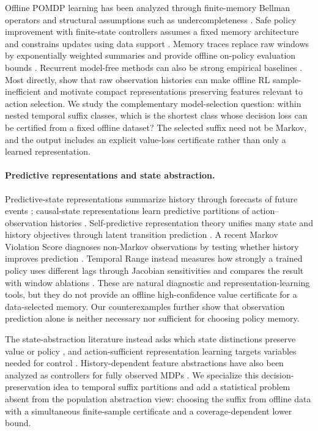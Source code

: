 \documentclass[letterpaper]{article} %
\theoremstyle{remark}
\begin{document}
Offline POMDP learning has been analyzed through finite-memory Bellman
operators and structural assumptions such as undercompleteness
\citep{guo2022offlinepomdp}. Safe policy improvement with finite-state
controllers assumes a fixed memory architecture and constrains updates using
data support \citep{simao2023safe}. Memory traces replace raw windows by
exponentially weighted summaries and provide offline on-policy evaluation
bounds \citep{eberhard2025traces}. Recurrent model-free methods can also be
strong empirical baselines \citep{ni2022recurrent}. Most directly,
\citet{hong2024histories} show that raw observation histories can make offline
RL sample-inefficient and motivate compact representations preserving features
relevant to action selection. We study the complementary model-selection
question: within nested temporal suffix classes, which is the shortest class
whose decision loss can be certified from a fixed offline dataset? The
selected suffix need not be Markov, and the output includes an explicit
value-loss certificate rather than only a learned representation.

\paragraph{Predictive representations and state abstraction.}
Predictive-state representations summarize history through forecasts of
future events \citep{littman2001predictive}; causal-state representations
learn predictive partitions of action--observation histories
\citep{zhang2019causal}. Self-predictive representation theory unifies many
state and history objectives through latent transition prediction
\citep{ni2024bridging}. A recent Markov Violation Score diagnoses non-Markov
observations by testing whether history improves prediction
\citep{mysore2026mvs}. Temporal Range instead measures how strongly a trained
policy uses different lags through Jacobian sensitivities and compares the
result with window ablations \citep{lafuente2025temporal}. These are natural
diagnostic and representation-learning tools, but they do not provide an
offline high-confidence value certificate for a data-selected memory. Our
counterexamples further show that observation prediction alone is neither
necessary nor sufficient for choosing policy memory.

The state-abstraction literature instead asks which state distinctions
preserve value or policy \citep{li2006unified,abel2016approximate,abel2020value},
and action-sufficient representation learning targets variables needed for
control \citep{huang2022action}. History-dependent feature abstractions have
also been analyzed as controllers for fully observed MDPs
\citep{patil2024history}. We specialize this decision-preservation idea to
temporal suffix partitions and add a statistical problem absent from the
population abstraction view: choosing the suffix from offline data with a
simultaneous finite-sample certificate and a coverage-dependent lower bound.
\end{document}
